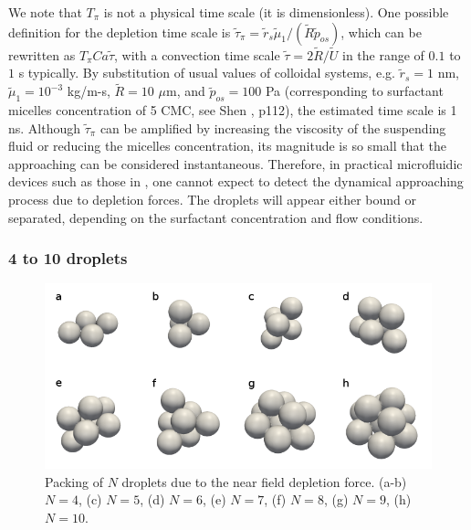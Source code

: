We note that $T_\pi$ is not a physical time scale (it is dimensionless). One possible definition for the depletion time scale is $\tilde{\tau}_\pi = \tilde{r}_s \tilde{\mu}_1 /(\tilde{R} \tilde{p}_{os})$, which can be rewritten as $T_\pi Ca \tilde{\tau}$, with a convection time scale $\tilde{\tau} =2\tilde{R}/\tilde{U}$ in the range of $0.1$ to $1$ s typically. By substitution of usual values of colloidal systems, e.g. $\tilde{r}_s = 1$ nm, $\tilde{\mu}_1 = 10^{-3}$ kg/m-s, $\tilde{R} = 10$ $\mu$m, and $\tilde{p}_{os} = 100$ Pa (corresponding to surfactant micelles concentration of 5 CMC, see Shen \cite{shen_thesis}, p112), the estimated time scale is 1 ns. Although $\tilde{\tau}_\pi$ can be amplified by increasing the viscosity of the suspending fluid or reducing the micelles concentration, its magnitude is so small that the approaching can be considered instantaneous. Therefore, in practical microfluidic devices such as those in   \cite{Shen_2016AS}, one cannot expect to detect the dynamical approaching process due to depletion forces. The droplets will appear either bound or separated, depending on the surfactant concentration and flow conditions.

\subsubsection{4 to 10 droplets}

\begin{figure}[t]
 \centering
 \includegraphics[width=0.9\columnwidth]{figs/packings.png}
 \caption{Packing of $N$ droplets due to the near field depletion force. (a-b) $N = 4$, (c) $N = 5$, (d) $N = 6$, (e) $N = 7$, (f) $N = 8$, (g) $N = 9$, (h) $N = 10$.}
 \label{fig: sph pack}
\end{figure}

